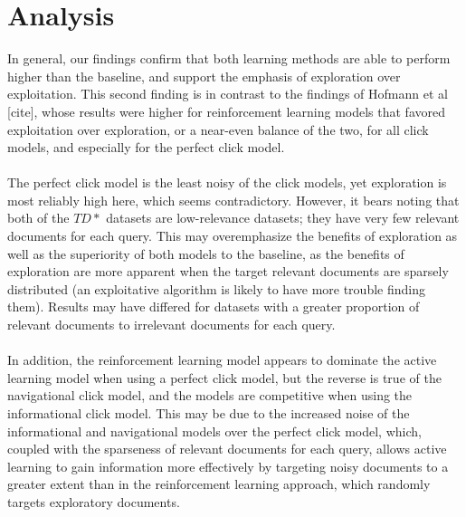 \documentclass{acm_proc_article-sp}
\begin{document}
\section{Analysis}
In general, our findings confirm that both learning methods are able to perform higher than the baseline, and support the emphasis of exploration over exploitation.  This second finding is in contrast to the findings of Hofmann et al [cite], whose results were higher for reinforcement learning models that favored exploitation over exploration, or a near-even balance of the two, for all click models, and especially for the perfect click model. \\ \\
The perfect click model is the least noisy of the click models, yet exploration is most reliably high here, which seems contradictory.  However, it bears noting that both of the $TD*$ datasets are low-relevance datasets; they have very few relevant documents for each query.  This may overemphasize the benefits of exploration as well as the superiority of both models to the baseline, as the benefits of exploration are more apparent when the target relevant documents are sparsely distributed (an exploitative algorithm is likely to have more trouble finding them).  Results may have differed for datasets with a greater proportion of relevant documents to irrelevant documents for each query.  \\ \\
In addition, the reinforcement learning model appears to dominate the active learning model when using a perfect click model, but the reverse is true of the navigational click model, and the models are competitive when using the informational click model.  This may be due to the increased noise of the informational and navigational models over the perfect click model, which, coupled with the sparseness of relevant documents for each query, allows active learning to gain information more effectively by targeting noisy documents to a greater extent than in the reinforcement learning approach, which randomly targets exploratory documents.   \\ \\




\balancecolumns
\end{document}
